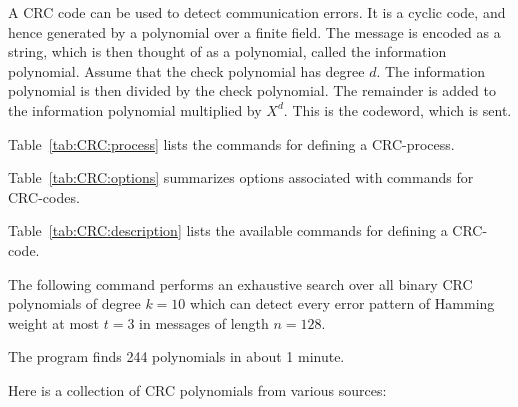 A CRC code can be used to detect communication errors. 
It is a cyclic code, and hence generated by a polynomial over a finite field. 
The message is encoded as a string, which is then thought of as a polynomial, 
called the information polynomial. 
Assume that the check polynomial has degree $d$.
The information polynomial is then divided by the check polynomial. 
The remainder is added to the information polynomial multiplied by $X^d.$
This is the codeword, which is sent.

\bigskip

Table~\ref{tab:CRC:process} 
lists the commands for defining a  CRC-process. 


\bigskip

Table~\ref{tab:CRC:options} 
summarizes options associated with commands for CRC-codes. 


\bigskip

Table~\ref{tab:CRC:description} 
lists the available commands for defining a CRC-code. 


\bigskip


The following command performs an exhaustive search 
over all binary CRC polynomials of degree $k=10$ 
which can detect every error pattern 
of Hamming weight at most $t=3$ in messages of length $n=128.$ 


The program finds 244 polynomials in about 1 minute.



\bigskip





Here is a collection of CRC polynomials from various sources:

















\bigskip


